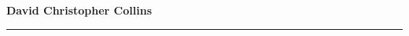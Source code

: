\documentclass[10pt]{article}
\begin{document}
\noindent 
{\bf\large David Christopher Collins}%

\noindent
\rule[9pt]{6.5in}{.3mm}

\medskip

%  

 
%

\medskip
 
%

\medskip
 
%


%




%

%

%

\medskip


%

\medskip


\medskip
   

\noindent
\end{document}
